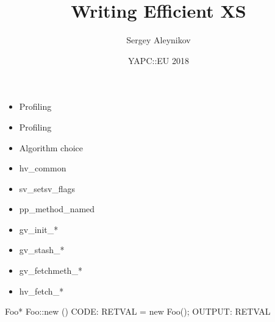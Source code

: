 \documentclass[mathserif,hyperref={urlcolor=cyan,colorlinks=true}]{beamer}
\title{Writing Efficient XS}
\author{Sergey Aleynikov}
\date[August 2018]{YAPC::EU 2018}
\begin{document}
{

\begin{frame}
\titlepage
\end{frame}

{
\color{white}

\begin{frame}[fragile]
\begin{itemize}
\pause
\item Profiling
\pause
\item Profiling
\pause
\item Algorithm choice
\end{itemize}
\end{frame}

\begin{frame}[fragile]
\begin{itemize}
\item hv{\_}common
\item sv{\_}setsv{\_}flags
\item pp{\_}method{\_}named
\end{itemize}
\end{frame}

\begin{frame}[fragile]
\begin{itemize}
\item gv{\_}init{\_}{\**}
\item gv{\_}stash{\_}{\**}
\item gv{\_}fetchmeth{\_}{\**}
\item hv{\_}fetch{\_}{\**}
\end{itemize}
\end{frame}

\begin{frame}[fragile]
\end{frame}

\begin{frame}[fragile]
\begin{ccode}
Foo*
Foo::new ()
CODE:
    RETVAL = new Foo();
OUTPUT:
    RETVAL
\end{ccode}
\end{frame}

}}
\end{document}
